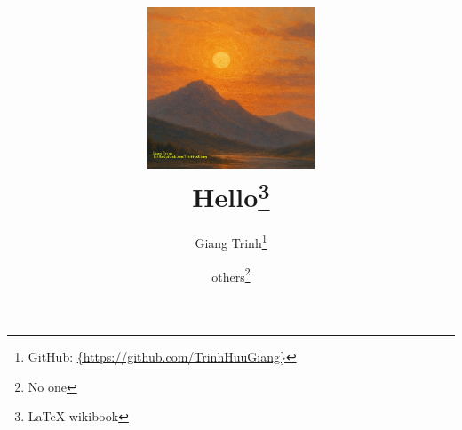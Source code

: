 \documentclass[12pt, a4paper, twoside]{report}
\begin{document}


\title
{
    \includegraphics[width=5cm]{./sunset.png} \\
    \textbf{Hello\thanks{\LaTeX {} wikibook}}
}
\author{Giang Trinh\thanks{GitHub: \url{{https://github.com/TrinhHuuGiang}}}
    \and others\thanks{No one}}
\maketitle



\end{document}
